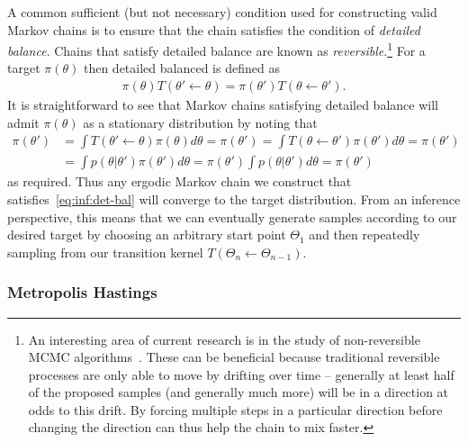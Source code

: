 A common sufficient (but not necessary) condition used for constructing valid Markov chains
is to ensure that the chain satisfies the condition of \emph{detailed balance}.  Chains that
satisfy detailed balance are known as 
\emph{reversible}.\footnote{An interesting area of current research is in the study
	of non-reversible MCMC algorithms~\citep{bouchard2015bouncy,bierkens2016zig}.  These can
	be beneficial because traditional reversible processes are only able to move by drifting over time -- generally
	at least half of the proposed samples (and generally much more) will be in a direction at odds to
	this drift.  By forcing multiple steps in a particular direction before changing the direction can thus
	help  the chain to mix faster.}
For a target $\pi(\theta)$ then detailed balanced is defined as
\begin{align}
\label{eq:inf:det-bal}
\pi(\theta) T(\theta' \leftarrow \theta) = \pi(\theta') T(\theta \leftarrow \theta').
\end{align}
It is straightforward to see that Markov chains satisfying detailed balance will admit $\pi(\theta)$
as a stationary distribution by noting that
\begin{align}
\pi(\theta') &= \int T(\theta' \leftarrow \theta) \pi(\theta)d\theta = \pi(\theta') = 
\int T(\theta \leftarrow \theta') \pi(\theta')d\theta = \pi(\theta') \\
&= \int p(\theta|\theta') \pi(\theta')d\theta = \pi(\theta') \int p(\theta|\theta') d\theta = \pi(\theta')
\end{align}
as required.  Thus any ergodic Markov chain we construct that satisfies~\eqref{eq:inf:det-bal}
will converge to the target distribution.  From an inference perspective, this means that
we can eventually generate samples according to our desired target by choosing an 
arbitrary start point $\Theta_1$ and then repeatedly sampling from our transition kernel $T(\Theta_n \leftarrow \Theta_{n-1})$.

\subsubsection{Metropolis Hastings}
\label{sec:inf:foundation:mcmc:mh}

